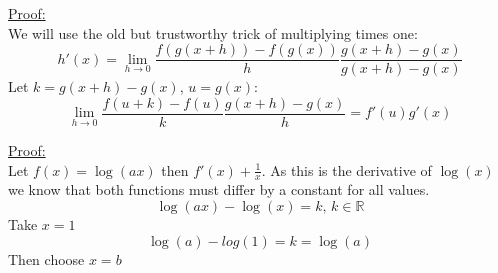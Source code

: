 \documentclass{book}
\newtheorem{theorem}{Theorem}[section]
\begin{document}
\begin{tcolorbox}[width=\textwidth,colback={mygray},title={\begin{theorem} $\log x$ is differentiable and its derivative is $\frac{1}{x}$\end{theorem}},colbacktitle=myblue,coltitle=black]    
\underline{Proof:}\\ We will use the old but trustworthy trick of multiplying times one: $$h'(x)=\lim_{h\rightarrow0}\frac{f(g(x+h))-f(g(x))}{h}\frac{g(x+h)-g(x)}{g(x+h)-g(x)}$$
Let $k=g(x+h)-g(x)$, $u=g(x)$:
$$\lim_{h\rightarrow0}\frac{f(u+k)-f(u)}{k}\frac{g(x+h)-g(x)}{h}=f'(u)g'(x)$$
\end{tcolorbox}

\begin{tcolorbox}[width=\textwidth,colback={mygray},title={\begin{theorem} If $a,b>0$ then we have $\log(ab)=\log a+\log b$\end{theorem}},colbacktitle=myblue,coltitle=black]    
\underline{Proof:}\\  Let $f(x)=\log(ax)$ then $f'(x)+\frac{1}{x}$. As this is the derivative of $\log(x)$ we know that both functions must differ by a constant for all values. 
$$\log(ax)-\log(x)=k,\, k\in \mathbb{R}$$
Take $x=1$
$$\log(a)-log(1)=k=\log(a)$$
Then choose $x=b$
\end{tcolorbox}
\end{document}
